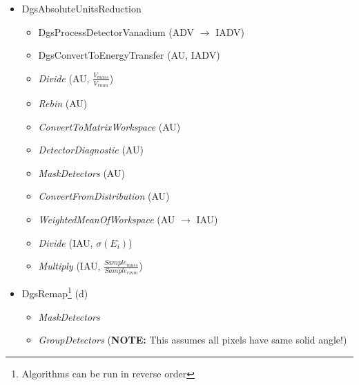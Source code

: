 \begin{itemize}
\item DgsAbsoluteUnitsReduction
\begin{itemize}
\item DgsProcessDetectorVanadium (ADV $\rightarrow$ IADV)
\item DgsConvertToEnergyTransfer (AU, IADV)
\item \textit{Divide} (AU, $\frac{V_{mass}}{V_{rmm}}$)
\item \textit{Rebin} (AU)
\item \textit{ConvertToMatrixWorkspace} (AU)
\item \textit{DetectorDiagnostic} (AU)
\item \textit{MaskDetectors} (AU)
\item \textit{ConvertFromDistribution} (AU)
\item \textit{WeightedMeanOfWorkspace} (AU $\rightarrow$ IAU)
\item \textit{Divide} (IAU, $\sigma(E_i)$)
\item \textit{Multiply} (IAU, $\frac{Sample_{mass}}{Sample_{rmm}}$)
\end{itemize}
\end{itemize}

\begin{itemize}
\item DgsRemap\footnote{Algorithms can be run in reverse order} (d)
\begin{itemize}
\item \textit{MaskDetectors}
\item \textit{GroupDetectors} (\textbf{NOTE:} This assumes all pixels have same solid angle!)
\end{itemize}
\end{itemize}
